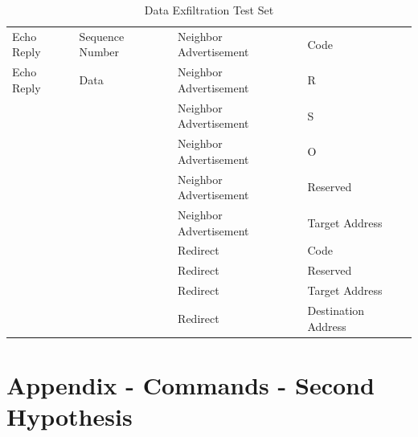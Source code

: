 \documentclass[12pt]{article}
\begin{document}
\begin{savenotes}
\begin{table}[!htpb]
{\begin{tabular}{|L{4.5cm}|L{3.5cm}|L{4.5cm}|L{3.5cm}|}
Echo Reply&Sequence Number&Neighbor Advertisement&Code\\
Echo Reply&Data&Neighbor Advertisement&R\\
&&Neighbor Advertisement&S\\
&&Neighbor Advertisement&O\\
&&Neighbor Advertisement&Reserved\\
&&Neighbor Advertisement&Target Address\\
&&Redirect&Code\\
&&Redirect&Reserved\\
&&Redirect&Target Address\\
&&Redirect&Destination Address\\
\hline
\end{tabular}}
\caption{Data Exfiltration Test Set}
\label{table:exfiltrationTestSet}
\end{table}
\end{savenotes}

\newpage

\section{Appendix - Commands - Second Hypothesis}
\label{AppendixCommands}
\end{document}
